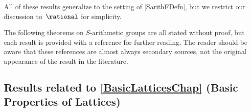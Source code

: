 \begin{rem}
All of these results generalize to the setting of \cref{SarithFDefn}, but we restrict our discussion to~$\rational$ for simplicity.
\end{rem}

The following theorems on $S$-arithmetic groups are all stated without proof, but each result is provided with a reference for further reading. The reader should be aware that these references are almost always secondary sources, not the original appearance of the result in the literature.





%



\subsection*{Results related to \cref{BasicLatticesChap} (Basic Properties of Lattices)} 

